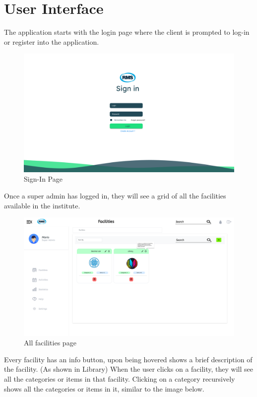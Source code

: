 \chapter{User Interface}

The application starts with the login page where the client is prompted to log-in or register into the application. 

\begin{figure}[H]
    \centering
    \includegraphics[scale=0.2]{images/Login Page.png}
    \caption{Sign-In Page}
    \label{fig:login-page}
\end{figure}
Once a super admin has logged in, they will see a grid of all the facilities available in the institute.
\begin{figure}[H]
    \centering
    \includegraphics[scale=0.2]{images/Facilities.png}
    \caption{All facilities page}
    \label{fig:facilities}
\end{figure}
Every facility has an info button, upon being hovered shows a brief description of the facility. (As shown in Library) 
When the user clicks on a facility, they will see all the categories or items in that facility. Clicking on a category recursively shows all the categories or items in it, similar to the image below. 
